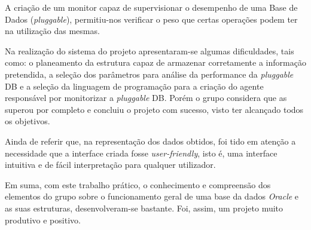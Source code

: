 \documentclass[a4paper]{article}
\begin{document}
A criação de um monitor capaz de supervisionar o desempenho de uma Base de Dados (\emph{pluggable}), permitiu-nos verificar o peso que certas operações podem ter na utilização das mesmas. 

Na realização do sistema do projeto apresentaram-se algumas dificuldades, tais como: o planeamento da estrutura capaz de armazenar corretamente a informação pretendida, a seleção dos parâmetros para análise da performance da \emph{pluggable} DB e a seleção da linguagem de programação para a criação do agente responsável por monitorizar a \emph{pluggable} DB. Porém o grupo considera que as superou por completo e concluiu o projeto com sucesso, visto ter alcançado todos os objetivos.

Ainda de referir que, na representação dos dados obtidos, foi tido em atenção a necessidade que a interface criada fosse \emph{user-friendly}, isto é, uma interface intuitiva e de fácil interpretação para qualquer utilizador.

Em suma, com este trabalho prático, o conhecimento e compreensão dos elementos do grupo sobre o funcionamento geral de uma base da dados \emph{Oracle} e as suas estruturas, desenvolveram-se bastante. Foi, assim, um projeto muito produtivo e positivo.
\end{document}
